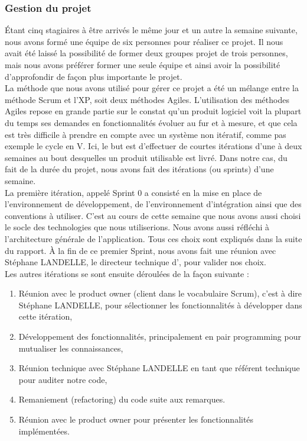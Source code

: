 \subsubsection{Gestion du projet}

Étant cinq stagiaires à être arrivés le même jour et un autre la semaine suivante, nous avons formé une équipe de six personnes pour réaliser ce projet. Il nous avait été laissé la possibilité de former deux groupes projet de trois personnes, mais nous avons préférer former une seule équipe et ainsi avoir la possibilité d'approfondir de façon plus importante le projet.\\

La méthode que nous avons utilisé pour gérer ce projet a été un mélange entre la méthode Scrum et l'XP, soit deux méthodes Agiles. L'utilisation des méthodes Agiles repose en grande partie sur le constat qu'un produit logiciel voit la plupart du temps ses demandes en fonctionnalités évoluer au fur et à mesure, et que cela est très difficile à prendre en compte avec un  système non itératif, comme pas exemple le cycle en V. Ici, le but est d'effectuer de courtes itérations d'une à deux semaines au bout desquelles un produit utilisable est livré. Dans notre cas, du fait de la durée du projet, nous avons fait des itérations (ou sprints) d'une semaine.\\

La première itération, appelé Sprint 0 a consisté en la mise en place de l'environnement de développement, de l'environnement d'intégration ainsi que des conventions à utiliser. C'est au cours de cette semaine que nous avons aussi choisi le socle des technologies que nous utiliserions. Nous avons aussi réfléchi à l'architecture générale de l'application. Tous ces choix sont expliqués dans la suite du rapport. À la fin de ce premier Sprint, nous avons fait une réunion avec Stéphane LANDELLE, le directeur technique d'\ebi{}, pour valider nos choix.\\

Les autres itérations se sont ensuite déroulées de la façon suivante :
\begin{enumerate}
	\item Réunion avec le \flqq{}product owner\frqq{} (client dans le vocabulaire Scrum), c'est à dire Stéphane LANDELLE, pour sélectionner les fonctionnalités à développer dans cette itération,
	
	\item Développement des fonctionnalités, principalement en pair programming pour mutualiser les connaissances,
	
	\item Réunion technique avec Stéphane LANDELLE en tant que référent technique pour auditer notre code,
	
	\item Remaniement (refactoring) du code suite aux remarques.
	
	\item Réunion avec le \flqq{}product owner\frqq{} pour présenter les fonctionnalités implémentées.\\
\end{enumerate}

